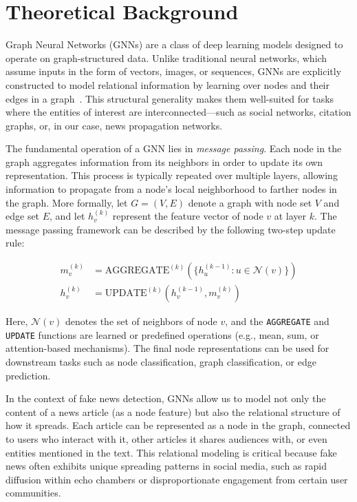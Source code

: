 \section{Theoretical Background}

Graph Neural Networks (GNNs) are a class of deep learning models designed to operate on graph-structured data. Unlike traditional neural networks, which assume inputs in the form of vectors, images, or sequences, GNNs are explicitly constructed to model relational information by learning over nodes and their edges in a graph~\cite{SanchezLengeling2021}. This structural generality makes them well-suited for tasks where the entities of interest are interconnected—such as social networks, citation graphs, or, in our case, news propagation networks.

The fundamental operation of a GNN lies in \textit{message passing}. Each node in the graph aggregates information from its neighbors in order to update its own representation. This process is typically repeated over multiple layers, allowing information to propagate from a node's local neighborhood to farther nodes in the graph. More formally, let $G = (V, E)$ denote a graph with node set $V$ and edge set $E$, and let $h_v^{(k)}$ represent the feature vector of node $v$ at layer $k$. The message passing framework can be described by the following two-step update rule:

\begin{align}
    m_v^{(k)} &= \text{AGGREGATE}^{(k)}\left(\{h_u^{(k-1)} : u \in \mathcal{N}(v)\}\right) \\
    h_v^{(k)} &= \text{UPDATE}^{(k)}\left(h_v^{(k-1)}, m_v^{(k)}\right)
\end{align}

Here, $\mathcal{N}(v)$ denotes the set of neighbors of node $v$, and the \texttt{AGGREGATE} and \texttt{UPDATE} functions are learned or predefined operations (e.g., mean, sum, or attention-based mechanisms). The final node representations can be used for downstream tasks such as node classification, graph classification, or edge prediction.

In the context of fake news detection, GNNs allow us to model not only the content of a news article (as a node feature) but also the relational structure of how it spreads. Each article can be represented as a node in the graph, connected to users who interact with it, other articles it shares audiences with, or even entities mentioned in the text. This relational modeling is critical because fake news often exhibits unique spreading patterns in social media, such as rapid diffusion within echo chambers or disproportionate engagement from certain user communities.

